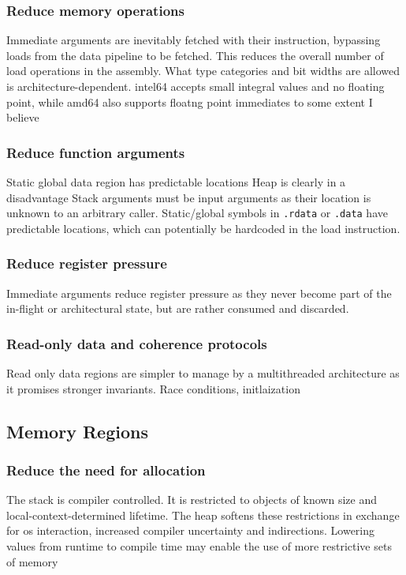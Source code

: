 \documentclass[conference]{IEEEtran}
\begin{document}
\subsubsection{Reduce memory operations}
Immediate arguments are inevitably fetched with their instruction, bypassing
loads from the data pipeline to be fetched.
This reduces the overall number of load operations in the assembly.
What type categories and bit widths are allowed is architecture-dependent.
intel64 accepts small integral values and no floating point, while amd64 also
supports floatng point immediates to some extent I believe

\subsubsection{Reduce function arguments}
Static global data region has predictable locations
Heap is clearly in a disadvantage
Stack arguments must be input arguments as their location is unknown to an
arbitrary caller.
Static/global symbols in \texttt{.rdata} or \texttt{.data} have predictable
locations, which can potentially be hardcoded in the load instruction.

\subsubsection{Reduce register pressure}
Immediate arguments reduce register pressure as they never become part of the
in-flight or architectural state, but are rather consumed and discarded.

\subsubsection{Read-only data and coherence protocols}
Read only data regions are simpler to manage by a multithreaded architecture as
it promises stronger invariants.
Race conditions, initlaization

\subsection{Memory Regions}

\subsubsection{Reduce the need for allocation}
The stack is compiler controlled.
It is restricted to objects of known size and local-context-determined lifetime.
The heap softens these restrictions in exchange for \ac{os} interaction,
increased compiler uncertainty and indirections.
Lowering values from runtime to compile time may enable the use of more
restrictive sets of memory
\end{document}
